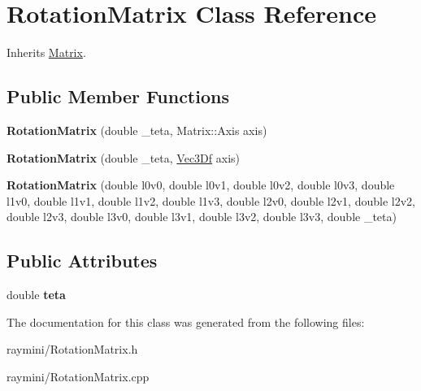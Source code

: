 \hypertarget{class_rotation_matrix}{
\section{RotationMatrix Class Reference}
\label{class_rotation_matrix}
}


Inherits \hyperlink{class_matrix}{Matrix}.

\subsection*{Public Member Functions}
\begin{DoxyCompactItemize}
\item 
\hypertarget{class_rotation_matrix_a43bae532c9142e771f42b304f0f5d558}{
{\bfseries RotationMatrix} (double \_\-teta, Matrix::Axis axis)}
\label{class_rotation_matrix_a43bae532c9142e771f42b304f0f5d558}

\item 
\hypertarget{class_rotation_matrix_ac4b890d0566925a5ee7890defe1b5926}{
{\bfseries RotationMatrix} (double \_\-teta, \hyperlink{class_vec3_d}{Vec3Df} axis)}
\label{class_rotation_matrix_ac4b890d0566925a5ee7890defe1b5926}

\item 
\hypertarget{class_rotation_matrix_a0fbd7c33d9c6840f47b3c0b7479c682d}{
{\bfseries RotationMatrix} (double l0v0, double l0v1, double l0v2, double l0v3, double l1v0, double l1v1, double l1v2, double l1v3, double l2v0, double l2v1, double l2v2, double l2v3, double l3v0, double l3v1, double l3v2, double l3v3, double \_\-teta)}
\label{class_rotation_matrix_a0fbd7c33d9c6840f47b3c0b7479c682d}

\end{DoxyCompactItemize}
\subsection*{Public Attributes}
\begin{DoxyCompactItemize}
\item 
\hypertarget{class_rotation_matrix_aec9f847b2b39893132122cc6da4d9cd7}{
double {\bfseries teta}}
\label{class_rotation_matrix_aec9f847b2b39893132122cc6da4d9cd7}

\end{DoxyCompactItemize}


The documentation for this class was generated from the following files:\begin{DoxyCompactItemize}
\item 
raymini/RotationMatrix.h\item 
raymini/RotationMatrix.cpp\end{DoxyCompactItemize}
